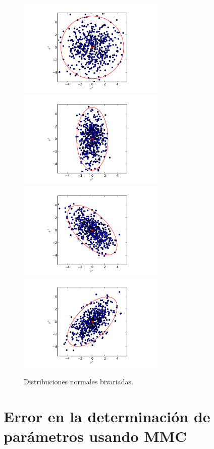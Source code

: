 \begin{figure}[h!]
\begin{center}
\includegraphics[width=7cm]{figs/fig-1x1.pdf}  \includegraphics[width=7cm]{figs/fig-1x2.pdf}
\includegraphics[width=7cm]{figs/fig-1x2rot1.pdf}  \includegraphics[width=7cm]{figs/fig-1x2rot2.pdf}
\caption{Distribuciones normales bivariadas.}
\end{center}
\label{fig-dist}
\end{figure}

\section{Error en la determinación de parámetros usando MMC}

